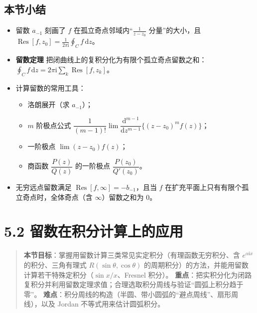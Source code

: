 \subsection{本节小结}\label{ux672cux8282ux5c0fux7ed3-12}

\begin{itemize}
\tightlist
\item
  留数 \(a_{-1}\) 刻画了 \(f\) 在孤立奇点邻域内``\(\frac{1}{z-z_0}\)
  分量''的大小，且
  \(\operatorname{Res}[f,z_0]=\frac{1}{2\pi\mathrm i}\oint_C f\,\mathrm dz\)。
\item
  \textbf{留数定理}
  把闭曲线上的复积分化为有限个孤立奇点留数之和：\(\oint_C f\,\mathrm dz=2\pi\mathrm i\sum_k\operatorname{Res}[f,z_k]\)。
\item
  计算留数的常用工具：

  \begin{itemize}
  \tightlist
  \item
    洛朗展开（求 \(a_{-1}\)）；
  \item
    \(m\) 阶极点公式
    \(\dfrac{1}{(m-1)!}\lim\dfrac{\mathrm d^{m-1}}{\mathrm dz^{m-1}}\{(z-z_0)^mf(z)\}\)；
  \item
    一阶极点 \(\lim(z-z_0)f(z)\)；
  \item
    商函数 \(\dfrac{P(z)}{Q(z)}\) 的一阶极点
    \(\dfrac{P(z_0)}{Q'(z_0)}\)。
  \end{itemize}
\item
  无穷远点留数满足 \(\operatorname{Res}[f,\infty]=-b_{-1}\)，且当 \(f\)
  在扩充平面上只有有限个孤立奇点时，全体奇点（含 \(\infty\)）留数之和为
  \(0\)。
\end{itemize}

\section{5.2
留数在积分计算上的应用}\label{ux7559ux6570ux5728ux79efux5206ux8ba1ux7b97ux4e0aux7684ux5e94ux7528}

\begin{quote}
\textbf{本节目标}：掌握用留数计算三类常见实定积分（有理函数无穷积分、含
\(e^{\alpha \mathrm i x}\) 的积分、三角有理式
\(R(\sin\theta,\cos\theta)\)
的周期积分）的方法，并能用留数计算若干特殊定积分（\(\sin x/x\)、Fresnel
积分）。
\textbf{重点}：把实积分化为闭路复积分并利用留数定理求值；合理选取积分周线与验证``圆弧上积分趋于零''。
\textbf{难点}：积分周线的构造（半圆、带小圆弧的``避点周线''、扇形周线），以及
Jordan 不等式用来估计圆弧积分。
\end{quote}

